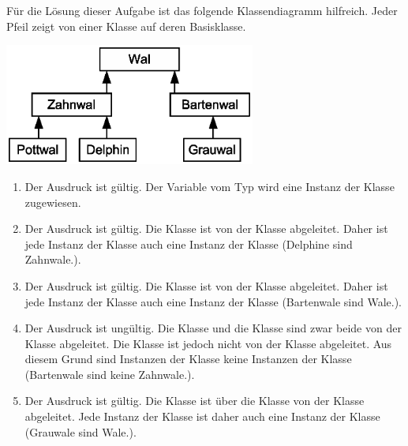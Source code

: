 \begin{frame}[t]%
\begin{solution}
F\"ur die L\"osung dieser Aufgabe ist das folgende Klassendiagramm hilfreich.
Jeder Pfeil zeigt von einer Klasse auf deren Basisklasse.
\begin{center}
\includegraphics[height=4cm]{klassen-hierarchie/wale}
\end{center}
\end{solution}
\end{frame}

\begin{frame}[t]%
\begin{solution}

\begin{enumerate}
\item
  Der Ausdruck ist g\"ultig.
  Der Variable  vom Typ  wird eine Instanz der Klasse  zugewiesen.
\item
  Der Ausdruck ist g\"ultig.
  Die Klasse  ist von der Klasse  abgeleitet.
  Daher ist jede Instanz der Klasse  auch eine Instanz der Klasse  (\glqq Delphine sind Zahnwale.\grqq).
\item
  Der Ausdruck ist g\"ultig.
  Die Klasse  ist von der Klasse  abgeleitet.
  Daher ist jede Instanz der Klasse  auch eine Instanz der Klasse  (\glqq Bartenwale sind Wale.\grqq).
\item
  Der Ausdruck ist ung\"ultig.
  Die Klasse  und die Klasse  sind zwar beide von der Klasse  abgeleitet.
  Die Klasse  ist jedoch nicht von der Klasse  abgeleitet.
  Aus diesem Grund sind Instanzen der Klasse  keine Instanzen der Klasse  (\glqq Bartenwale sind keine Zahnwale.\grqq).
\item
  Der Ausdruck ist g\"ultig.
  Die Klasse  ist \"uber die Klasse  von der Klasse  abgeleitet.
  Jede Instanz der Klasse  ist daher auch eine Instanz der Klasse  (\glqq Grauwale sind Wale.\grqq).
\end{enumerate}
\end{solution}
\end{frame}


